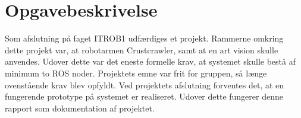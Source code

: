 \chapter{Opgavebeskrivelse}\label{chap:Opgavebeskrivelse}
Som afslutning på faget ITROB1 udfærdiges et projekt. Rammerne omkring dette projekt var, at robotarmen Crustcrawler, samt at en art vision skulle anvendes. Udover dette var det eneste formelle krav, at systemet skulle bestå af minimum to ROS noder. 
Projektets emne var frit for gruppen, så længe ovenstående krav blev opfyldt. 
Ved projektets afslutning forventes det, at en fungerende prototype på systemet er realiseret. Udover dette fungerer denne rapport som dokumentation af projektet. 
